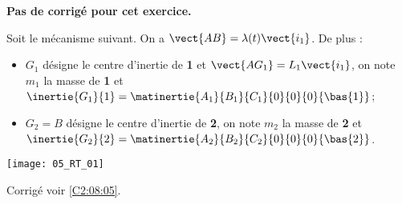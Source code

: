 \normaltrue
\correctionfalse


\setcounter{numques}{0}
\ifcorrection
\else
\textbf{Pas de corrigé pour cet exercice.}
\fi

\ifprof
\else
Soit le mécanisme suivant. On a $\vect{AB}=\lambda(t)\vect{i_1}$. De plus :
\begin{itemize}
\item $G_1$ désigne le centre d'inertie de \textbf{1} et $\vect{AG_1}=L_1\vect{i_1}$, on note $m_1$ la masse de \textbf{1} et $\inertie{G_1}{1}=\matinertie{A_1}{B_1}{C_1}{0}{0}{0}{\bas{1}}$; 
\item $G_2=B$ désigne le centre d'inertie de \textbf{2}, on note $m_2$ la masse de \textbf{2} et $\inertie{G_2}{2}=\matinertie{A_2}{B_2}{C_2}{0}{0}{0}{\bas{2}}$.
\end{itemize}
\begin{center}
\texttt{[image: 05\_RT\_01]}
\end{center}
\fi

\ifprof
\else
\fi

\ifprof
\else
\fi

\ifprof
\else
\begin{flushright}
\footnotesize{Corrigé  voir \ref{C2:08:05}.}
\end{flushright}%
\fi